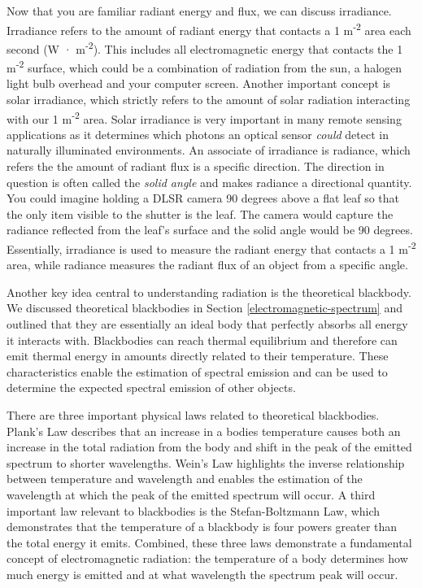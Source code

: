 \documentclass[
]{book}
\begin{document}
Now that you are familiar radiant energy and flux, we can discuss
irradiance. Irradiance refers to the amount of radiant energy that
contacts a 1 m\textsuperscript{-2} area each second (W · m\textsuperscript{-2}). This includes all
electromagnetic energy that contacts the 1 m\textsuperscript{-2} surface, which
could be a combination of radiation from the sun, a halogen light
bulb overhead and your computer screen. Another important concept is
solar irradiance, which strictly refers to the amount of solar
radiation interacting with our 1 m\textsuperscript{-2} area. Solar irradiance is
very important in many remote sensing applications as it determines
which photons an optical sensor \emph{could} detect in naturally illuminated
environments. An associate of irradiance is radiance, which refers the
the amount of radiant flux is a specific direction. The direction in
question is often called the \emph{solid angle} and makes radiance a
directional quantity. You could imagine holding a DLSR camera 90 degrees
above a flat leaf so that the only item visible to the shutter is the
leaf. The camera would capture the radiance reflected from the leaf's
surface and the solid angle would be 90 degrees. Essentially, irradiance
is used to measure the radiant energy that contacts a 1 m\textsuperscript{-2} area,
while radiance measures the radiant flux of an object from a specific
angle.

Another key idea central to understanding radiation is the
theoretical blackbody. We discussed theoretical blackbodies in Section
\ref{electromagnetic-spectrum} and outlined that they are essentially
an ideal body that perfectly absorbs all energy it interacts with.
Blackbodies can reach thermal equilibrium and therefore can emit thermal
energy in amounts directly related to their temperature. These
characteristics enable the estimation of spectral emission and can be
used to determine the expected spectral emission of other objects.

There are three important physical laws related to theoretical
blackbodies. Plank's Law describes that an increase in a bodies
temperature causes both an increase in the total radiation from the
body and shift in the peak of the emitted spectrum to shorter
wavelengths. Wein's Law highlights the inverse relationship between
temperature and wavelength and enables the estimation of the wavelength
at which the peak of the emitted spectrum will occur. A third important
law relevant to blackbodies is the Stefan-Boltzmann Law, which
demonstrates that the temperature of a blackbody is four powers greater
than the total energy it emits. Combined, these three laws
demonstrate a fundamental concept of electromagnetic radiation: the
temperature of a body determines how much energy is emitted and at
what wavelength the spectrum peak will occur.
\end{document}
